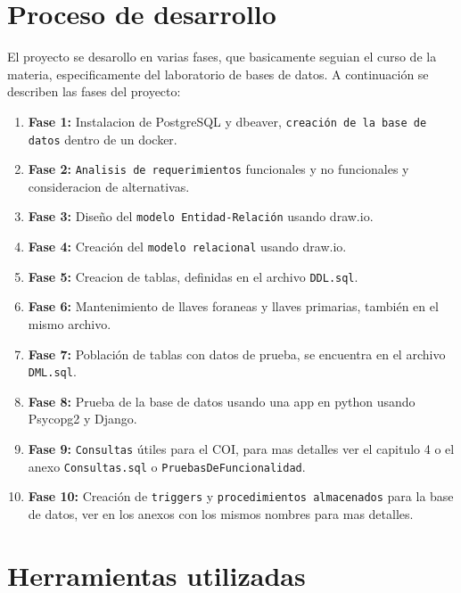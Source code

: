 \section{Proceso de desarrollo}

El proyecto se desarollo en varias fases, que basicamente seguian el curso de la materia, especificamente del laboratorio de bases de datos. A continuación se describen las fases del proyecto:
\begin{enumerate}
    \item \textbf{Fase 1:} Instalacion de PostgreSQL y dbeaver, \texttt{creación de la base de datos} dentro de un docker.
    \item  \textbf{Fase 2:} \texttt{Analisis de requerimientos} funcionales y no funcionales y consideracion de alternativas.
    \item \textbf{Fase 3:} Diseño del \texttt{modelo Entidad-Relación} usando draw.io.
    \item \textbf{Fase 4:} Creación del \texttt{modelo relacional} usando draw.io.
    \item \textbf{Fase 5:} Creacion de tablas, definidas en el archivo \texttt{DDL.sql}.
    \item \textbf{Fase 6:} Mantenimiento de llaves foraneas y llaves primarias, también en el mismo archivo.
    \item \textbf{Fase 7:} Población de tablas con datos de prueba, se encuentra en el archivo \texttt{DML.sql}.
    \item \textbf{Fase 8:} Prueba de la base de datos usando una app en python usando Psycopg2 y Django.
    \item \textbf{Fase 9:} \texttt{Consultas} útiles para el COI, para mas detalles ver el capitulo 4 o el anexo \texttt{Consultas.sql} o  \texttt{PruebasDeFuncionalidad}.
    \item \textbf{Fase 10:} Creación de \texttt{triggers} y \texttt{procedimientos almacenados} para la base de datos, ver en los anexos con los mismos nombres para mas detalles.
\end{enumerate}

\section{Herramientas utilizadas}

